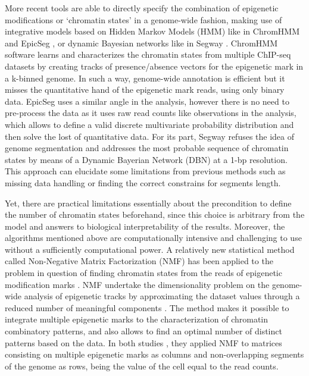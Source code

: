 \medskip

More recent tools are able to directly specify the combination of epigenetic modifications or `chromatin states' in a genome-wide fashion, making use of integrative models based on Hidden Markov Models (HMM) like in ChromHMM \cite{Ernst2010,Ernst2017} and EpicSeg \cite{Mammana2015}, or dynamic Bayesian networks like in Segway \cite{Hoffman2012}. ChromHMM software learns and characterizes the chromatin states from multiple ChIP-seq datasets by creating tracks of presence/absence vectors for the epigenetic mark in a k-binned genome. In such a way, genome-wide annotation is efficient but it misses the quantitative hand of the epigenetic mark reads, using only binary data. EpicSeg uses a similar angle in the analysis, however there is no need to pre-process the data as it uses raw read counts like observations in the analysis, which allows to define a valid discrete multivariate probability distribution and then solve the lost of quantitative data. For its part, Segway refuses the idea of genome segmentation and addresses the most probable sequence of chromatin states by means of a Dynamic Bayerian Network (DBN) at a 1-bp resolution. This approach can elucidate some limitations from previous methods such as missing data handling or finding the correct constrains for segments length.

\medskip

Yet, there are practical limitations essentially about the precondition to define the number of chromatin states beforehand, since this choice is arbitrary from the model and answers to biological interpretability of the results. Moreover, the algorithms mentioned above are computationally intensive and challenging to use without a sufficiently computational power. A relatively new statistical method called Non-Negative Matrix Factorization (NMF) \cite{Lee1999} has been applied to the problem in question of finding chromatin states from the reads of epigenetic modification marks \cite{Cieslik2014,Gandolfi2017}. NMF undertake the dimensionality problem on the genome-wide analysis of epigenetic tracks by approximating the dataset values through a reduced number of meaningful components \cite{Devarajan2008}. The method makes it possible to integrate multiple epigenetic marks to the characterization of chromatin combinatory patterns, and also allows to find an optimal number of distinct patterns based on the data. In both studies \cite{Cieslik2014,Gandolfi2017}, they applied NMF to matrices consisting on multiple epigenetic marks as columns and non-overlapping segments of the genome as rows, being the value of the cell equal to the read counts.

